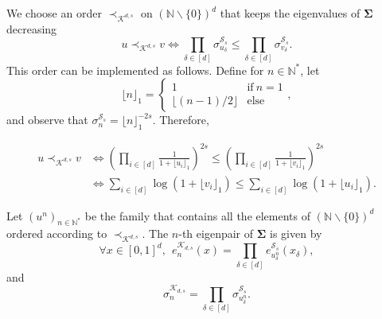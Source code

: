 \documentclass[twoside,11pt]{book}
\numberwithin{theorem}{chapter}
\numberwithin{definition}{chapter}
\numberwithin{proposition}{chapter}
\numberwithin{corollary}{chapter}
\numberwithin{example}{chapter}
\numberwithin{lemma}{chapter}
\numberwithin{assumption}{chapter}
\begin{document}






We choose an order $\prec_{\mathcal{K}^{d,s}}$ on $(\mathbb{N}\smallsetminus \{0\})^{d}$ that keeps the eigenvalues of $\bm{\Sigma}$ decreasing
\begin{equation}
u \prec_{\mathcal{K}^{d,s}} v \iff  \prod\limits_{\delta \in [d]} \sigma^{\mathcal{S}_{s}}_{u_{\delta}} \leq \prod\limits_{\delta \in [d]} \sigma^{\mathcal{S}_{s}}_{v_{\delta}}.
\end{equation}
This order can be implemented as follows. Define for $n \in \mathbb{N}^{*}$, let
\begin{equation}
 \lfloor{n\rfloor}_{1} = \left\{
    \begin{array}{ll}
        1 & \mbox{if} \:n =1 \\
        \lfloor{(n-1)/2\rfloor} & \mbox{else}
    \end{array}
\right. ,
\end{equation}
and observe that $\sigma_{n}^{\mathcal{S}_{s}} = \lfloor{n\rfloor}_{1}^{-2s}$. Therefore,




\begin{align}
u \prec_{\mathcal{K}^{d,s}} v  & \iff \left(\prod\limits_{i \in [d]} \frac{1}{1+\lfloor{u_{i} \rfloor}_{1}} \right)^{2s} \leq \left(\prod\limits_{i \in [d]} \frac{1}{1+\lfloor{v_{i}\rfloor}_{1}} \right)^{2s} \\
& \iff \sum\limits_{i \in [d]} \log(1+\lfloor{v_{i} \rfloor}_{1})  \leq \sum\limits_{i \in [d]} \log(1+\lfloor{u_{i} \rfloor}_{1}) .
\label{e:orderSobolev}
\end{align}

Let $(u^{n})_{n \in \mathbb{N}^{*}}$ be the family that contains all the elements of $(\mathbb{N} \smallsetminus \{0\})^d$  ordered according to $\prec_{\mathcal{K}^{d,s}}$. The $n$-th eigenpair of $\bm{\Sigma}$ is given by
\begin{equation}
\forall x \in [0,1]^{d}, \:\:e_{n}^{\mathcal{K}_{d,s}}(x) = \prod\limits_{\delta \in [d]} e_{u_{\delta}^{n}}^{\mathcal{S}_{s}}(x_{\delta}),
\end{equation}
and
\begin{equation}
\sigma_{n}^{\mathcal{K}_{d,s}} = \prod\limits_{\delta \in [d]} \sigma_{u_{\delta}^{n}}^{\mathcal{S}_{s}}.
\end{equation}
\end{document}
